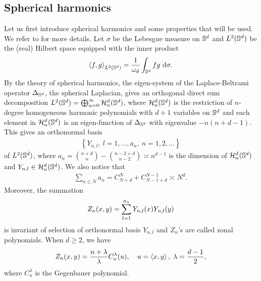 \subsection{Spherical harmonics}
Let us first introduce spherical harmonics and some properties that will be used.
We refer to \citet{dai2013_ApproximationTheory} for more details.
Let $\sigma$ be the Lebesgue measure on $\mathbb{S}^d$ and $L^2(\mathbb{S}^d)$ be the (real) Hilbert space equipped with the inner product
\begin{align*}
  \left\langle{f,g}\right\rangle_{L^2(\mathbb{S}^d)} = \frac{1}{\omega_{d}}\int_{\mathbb{S}^d} f g~ \dd \sigma.
\end{align*}
By the theory of spherical harmonics, the eigen-system of the Laplace-Beltrami operator $\Delta_{\mathbb{S}^d}$,
the spherical Laplacian, gives an orthogonal direct sum decomposition
$L^2(\mathbb{S}^d) = \bigoplus_{n=0}^{\infty} \mathcal{H}^d_n(\mathbb{S}^d)$,
where $\mathcal{H}^d_n(\mathbb{S}^d)$
is the restriction of $n$-degree homogeneous harmonic polynomials with $d+1$ variables on $\mathbb{S}^d$
and each element in $\mathcal{H}^d_n(\mathbb{S}^d)$ is an eigen-function of $\Delta_{\mathbb{S}^d}$ with eigenvalue $-n(n+d-1)$.
This gives an orthonormal basis
\begin{align*}
  \left\{ Y_{n,l},\ l = 1,\dots,a_n,\ n = 1,2,\dots \right\}
\end{align*}
of $L^2(\mathbb{S}^d)$, where
$a_n = \binom{n+d}{n} - \binom{n-2+d}{n-2} \asymp n^{d-1}$
is the dimension of $\mathcal{H}^d_n(\mathbb{S}^d)$ and $Y_{n,l} \in \mathcal{H}^d_n(\mathbb{S}^d)$.
We also notice that
\begin{align}
  \label{eq:SH_DimensionCount}
  \sum_{n\leq N} a_n = C^N_{N+d} + C^{N-1}_{N-1+d} \asymp N^d.
\end{align}
Moreover, the summation
\begin{align}
  Z_n(x,y) = \sum_{l=1}^{a_n} Y_{n,l}(x)Y_{n,l}(y)
\end{align}
is invariant of selection of orthonormal basis $Y_{n,l}$
and $Z_n$'s are called zonal polynomials.
When $d \geq 2$, we have
\begin{align}
  \label{eq:Zonal_Gegenbauer}
  Z_n(x,y) = \frac{n+\lambda}{\lambda} C_n^{\lambda}(u),\quad u = \left\langle{x,y}\right\rangle,\; \lambda = \frac{d-1}{2},
\end{align}
where $C_n^\lambda$ is the Gegenbauer polynomial.


